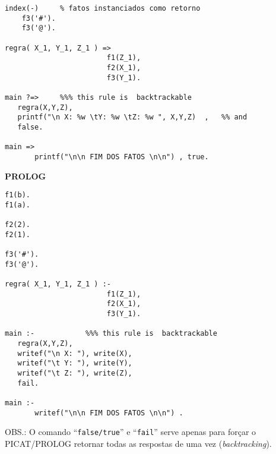 \documentclass[a4paper,11pt]{article}
\begin{document}
\begin{enumerate}
\begin{minipage}{0.45\textwidth}
\begin{tiny}
\begin{verbatim}
index(-)     % fatos instanciados como retorno
    f3('#').
    f3('@').
    
regra( X_1, Y_1, Z_1 ) =>     
                      	f1(Z_1),
          	            f2(X_1),
          	            f3(Y_1).

main ?=>     %%% this rule is  backtrackable
   regra(X,Y,Z),                            
   printf("\n X: %w \tY: %w \tZ: %w ", X,Y,Z)  ,   %% and
   false.

main => 
       printf("\n\n FIM DOS FATOS \n\n") , true. 
\end{verbatim}
\end{tiny}
\end{minipage}
\begin{minipage}{0.45\textwidth}
\begin{tiny}
\begin{center}{\bf PROLOG}\end{center}
\begin{verbatim}
f1(b).
f1(a).
    
f2(2).
f2(1).
    	
f3('#').
f3('@').
    
regra( X_1, Y_1, Z_1 ) :-
                      	f1(Z_1),
          	            f2(X_1),
          	            f3(Y_1).

main :-            %%% this rule is  backtrackable
   regra(X,Y,Z),                            
   writef("\n X: "), write(X),
   writef("\t Y: "), write(Y),
   writef("\t Z: "), write(Z), 
   fail.

main :- 
       writef("\n\n FIM DOS FATOS \n\n") . 
\end{verbatim}
\end{tiny}
\end{minipage}

\vskip 0.3cm

OBS.: O comando ``\texttt{false/true}'' e ``\texttt{fail}'' serve apenas para forçar o PICAT/PROLOG retornar todas as respostas de uma vez ({\em backtracking}).

\end{enumerate}
\end{document}

